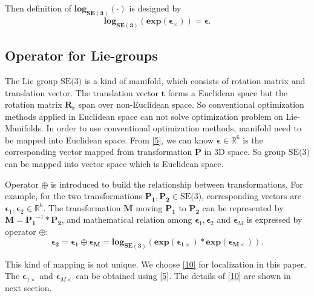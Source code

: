 \documentclass[journal]{IEEEtran}
\begin{document}
Then definition of $\mathbf{log_{SE(3)}(\cdot)}$ is designed by
\begin{equation}\label{21}
\mathbf {log_{SE(3)}(exp(\epsilon_{\times})) = \epsilon}.
\end{equation}

\subsection{Operator for Lie-groups}
 
 The Lie group $\text{SE(3)}$ is a kind of manifold, which consists of rotation matrix and translation vector. The translation vector $\mathbf{t}$ forms a Euclidean space but the rotation matrix $\mathbf{R_r}$ span over non-Euclidean space. So conventional optimization methods applied in Euclidean space can not solve optimization problem on Lie-Manifolds. In order to use conventional optimization methods, manifold need to be mapped into Euclidean space. From \eqref{5}, we can know $
\mathbf{\epsilon} \in \mathbb{R}^{6}$ is the corresponding vector mapped from transformation $\mathbf{P}$ in 3D space. So group $\text{SE(3)}$ can be mapped into vector space which is Euclidean space. 

Operator $\oplus$ is introduced to build the relationship between transformations. For example, for the two transformations $\mathbf{P_1}, \mathbf{P_2} \in \text{SE(3)}$, corresponding vectors are $\mathbf{\epsilon}_{1}, \mathbf{\epsilon}_{2} \in \mathbb{R}^{6} $. The transformation $\mathbf{M}$ moving $\mathbf{P_1}$ to $\mathbf{P_2}$ can be represented by $\mathbf{M} = \mathbf{P_1}^{-1}*\mathbf{P_2}$, and mathematical relation among $\mathbf{\epsilon}_{1}, \mathbf{\epsilon}_{2}$ and $\mathbf{\epsilon}_M$ is expressed by operator $\oplus$:
\begin{equation}\label{10}
\mathbf{\epsilon_2 = \mathbf{\epsilon}_1  \oplus \mathbf{\epsilon}_M }
= \mathbf {log_{SE(3)}(exp(\mathbf{\epsilon}_{1\times} )*exp(\mathbf{\epsilon}_{M\times}))}.
\end{equation}

This kind of mapping is not unique. We choose \eqref{10} for localization in this paper. The $\mathbf{\epsilon}_{1\times}$ and $\mathbf{\epsilon}_{M\times}$ can be obtained using \eqref{5}. The details of \eqref{10} are shown in next section. 
\end{document}

